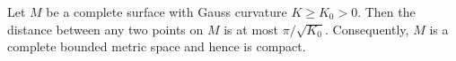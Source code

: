 Let $M$ be a complete surface with Gauss curvature $K \geq K_0 > 0$. Then the distance between any two points on $M$ is at most $\pi/\sqrt{K_0}$. Consequently, $M$ is a complete bounded metric space and hence is compact.
